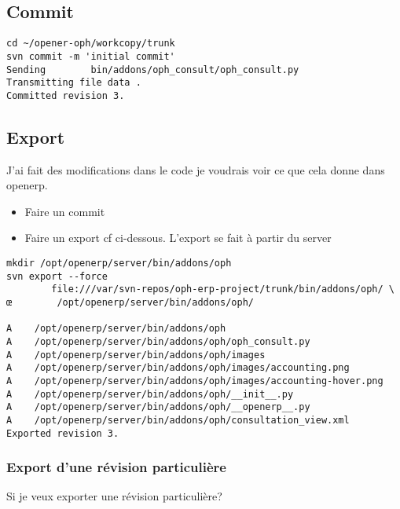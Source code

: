 \documentclass[12pt,a4paper]{article}
\begin{document}
\subsection{Commit}
\label{sec:commit}
\begin{verbatim}
cd ~/opener-oph/workcopy/trunk
svn commit -m 'initial commit'
Sending        bin/addons/oph_consult/oph_consult.py
Transmitting file data .
Committed revision 3.
\end{verbatim}


\subsection{Export}
\label{sec:export}

J'ai fait des modifications dans le code je voudrais voir ce que cela donne dans openerp. 
\begin{itemize}
\item Faire un commit
\item Faire un export cf ci-dessous. L'export se fait à partir du server
\end{itemize}

\begin{verbatim}
mkdir /opt/openerp/server/bin/addons/oph
svn export --force 
        file:///var/svn-repos/oph-erp-project/trunk/bin/addons/oph/ \
œ        /opt/openerp/server/bin/addons/oph/

A    /opt/openerp/server/bin/addons/oph
A    /opt/openerp/server/bin/addons/oph/oph_consult.py
A    /opt/openerp/server/bin/addons/oph/images
A    /opt/openerp/server/bin/addons/oph/images/accounting.png
A    /opt/openerp/server/bin/addons/oph/images/accounting-hover.png
A    /opt/openerp/server/bin/addons/oph/__init__.py
A    /opt/openerp/server/bin/addons/oph/__openerp__.py
A    /opt/openerp/server/bin/addons/oph/consultation_view.xml
Exported revision 3.
\end{verbatim}

\subsubsection{Export d'une révision particulière}
\label{sec:export_rev}

Si je veux exporter une révision particulière?
\end{document}
